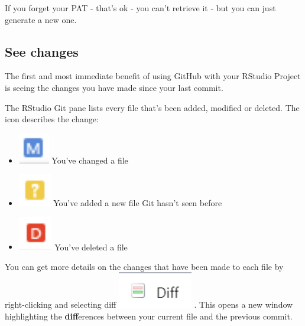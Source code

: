 \documentclass[
]{book}
\begin{document}
If you forget your PAT - that's ok - you can't retrieve it - but you can just generate a new one.

\hypertarget{see-changes}{%
\subsection{See changes}\label{see-changes}}

The first and most immediate benefit of using GitHub with your RStudio Project is seeing the changes you have made since your last commit.

The RStudio Git pane lists every file that's been added, modified or deleted. The icon describes the change:

\begin{itemize}
\item
  \includegraphics[width=0.53in]{images/git-modified} You've changed a file
\item
  \includegraphics[width=0.56in]{images/git-unknown} You've added a new file Git hasn't seen before
\item
  \includegraphics[width=0.58in]{images/git-deleted} You've deleted a file
\end{itemize}

You can get more details on the changes that have been made to each file by right-clicking and selecting diff
\includegraphics[width=1.28in]{images/git-diff} . This opens a new window highlighting the \textbf{diff}erences between your current file and the previous commit.
\end{document}
